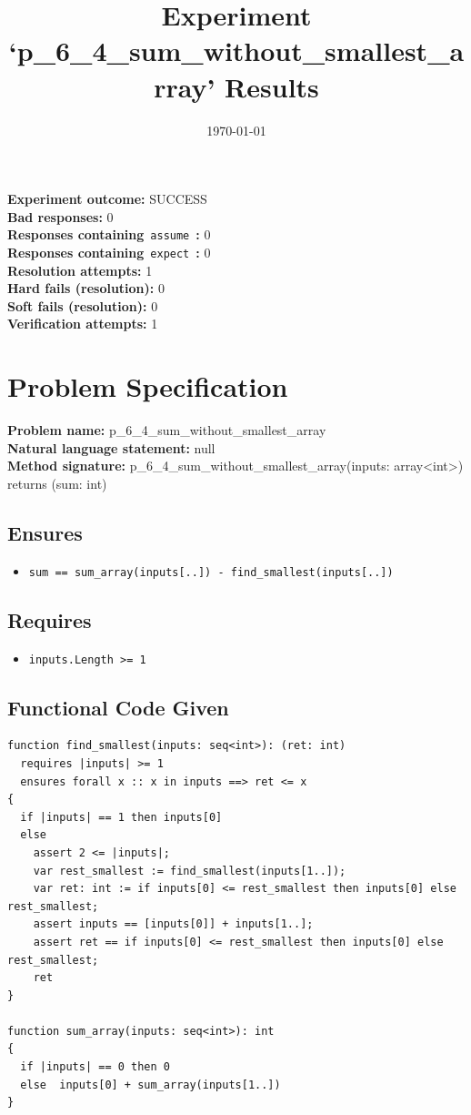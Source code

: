 \documentclass{article}
\begin{document}
\title{Experiment `p\_6\_4\_sum\_without\_smallest\_array' Results}
\author{\today}
\date{}
\maketitle
\textbf{Experiment outcome: }SUCCESS
\\\textbf{Bad responses: }0
\\\textbf{Responses containing}~\texttt{assume}~\textbf{: }0
\\\textbf{Responses containing}~\texttt{expect}~\textbf{: }0
\\\textbf{Resolution attempts: }1
\\\textbf{Hard fails (resolution): }0
\\\textbf{Soft fails (resolution): }0
\\\textbf{Verification attempts: }1
\section*{Problem Specification}
\textbf{Problem name: }p\_6\_4\_sum\_without\_smallest\_array
\\\textbf{Natural language statement: }null
\\\textbf{Method signature: }p\_6\_4\_sum\_without\_smallest\_array(inputs: array<int>) returns (sum: int)
\subsection*{Ensures}
\begin{itemize}
\item \texttt{sum == sum\_array(inputs[..]) - find\_smallest(inputs[..])}
\end{itemize}
\subsection*{Requires}
\begin{itemize}
\item \texttt{inputs.Length >= 1}
\end{itemize}
\subsection*{Functional Code Given}
\begin{lstlisting}
function find_smallest(inputs: seq<int>): (ret: int)
  requires |inputs| >= 1
  ensures forall x :: x in inputs ==> ret <= x 
{
  if |inputs| == 1 then inputs[0]
  else 
    assert 2 <= |inputs|;
    var rest_smallest := find_smallest(inputs[1..]);
    var ret: int := if inputs[0] <= rest_smallest then inputs[0] else rest_smallest;
    assert inputs == [inputs[0]] + inputs[1..]; 
    assert ret == if inputs[0] <= rest_smallest then inputs[0] else rest_smallest;
    ret 
}

function sum_array(inputs: seq<int>): int
{
  if |inputs| == 0 then 0
  else  inputs[0] + sum_array(inputs[1..])
}
\end{lstlisting}
\clearpage
\end{document}
